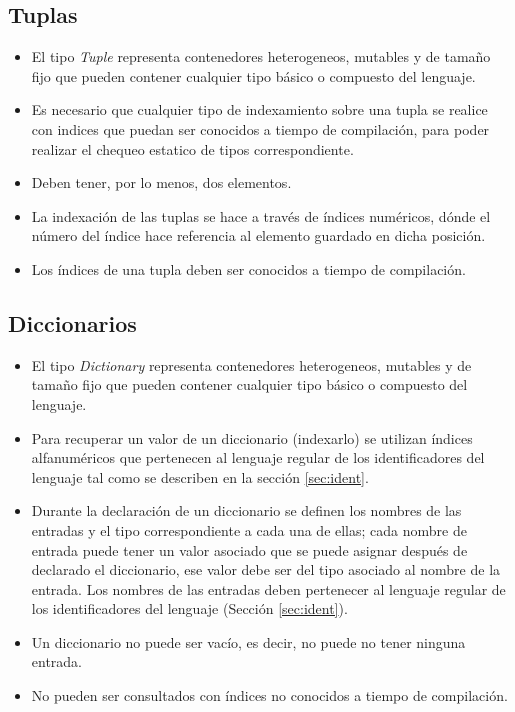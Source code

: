 \documentclass[12pt, spanish]{report}
\begin{document}
\subsection{Tuplas}
\label{sec:tuples}
\begin{itemize}
\item El tipo \emph{Tuple} representa contenedores heterogeneos,
  mutables y de tama\~no fijo que pueden contener cualquier tipo
  b\'asico o compuesto del lenguaje.
\item Es necesario que cualquier tipo de indexamiento sobre una tupla
  se realice con indices que puedan ser conocidos a tiempo de
  compilaci\'on, para poder realizar el chequeo estatico de tipos
  correspondiente.
\item Deben tener, por lo menos, dos elementos.
\item La indexaci\'on de las tuplas se hace a trav\'es de \'indices
  num\'ericos, d\'onde el n\'umero del \'indice hace referencia al elemento
  guardado en dicha posici\'on.
\item Los \'indices de una tupla deben ser conocidos a tiempo de
  compilaci\'on.
\end{itemize}

\subsection{Diccionarios}
\label{sec:dics}
\begin{itemize}
\item El tipo \emph{Dictionary} representa contenedores heterogeneos,
  mutables y de tama\~no fijo que pueden contener cualquier tipo
  b\'asico o compuesto del lenguaje.
\item Para recuperar un valor de un diccionario (indexarlo) se
  utilizan \'indices alfanum\'ericos que pertenecen al lenguaje
  regular de los identificadores del lenguaje tal como se describen en
  la secci\'on \ref{sec:ident}.
\item Durante la declaraci\'on de un diccionario se definen los
  nombres de las entradas y el tipo correspondiente a cada una de
  ellas; cada nombre de entrada puede tener un valor asociado que se
  puede asignar despu\'es de declarado el diccionario, ese valor debe
  ser del tipo asociado al nombre de la entrada. Los nombres de las
  entradas deben pertenecer al lenguaje regular de los identificadores
  del lenguaje (Secci\'on \ref{sec:ident}).
\item Un diccionario no puede ser vac\'io, es decir, no puede no tener
  ninguna entrada.
\item No pueden ser consultados con \'indices no conocidos a tiempo de
  compilaci\'on.
\end{itemize}
\end{document}
